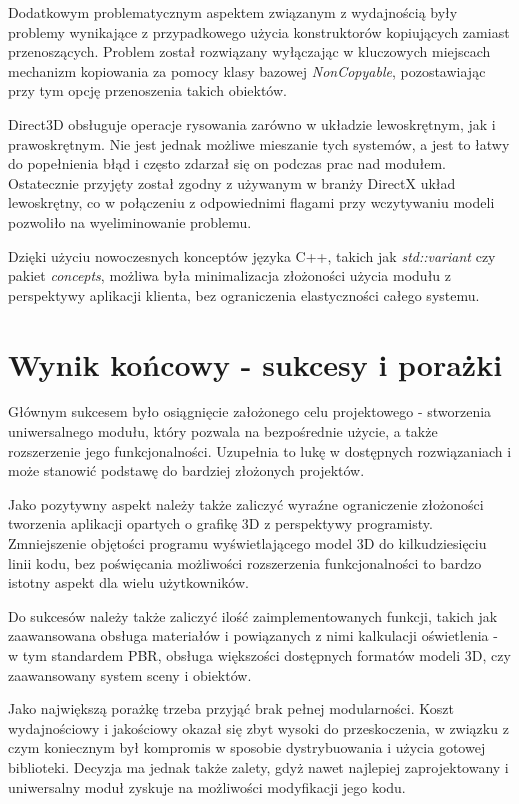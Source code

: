 Dodatkowym problematycznym aspektem związanym z wydajnością były problemy wynikające z przypadkowego użycia konstruktorów kopiujących zamiast przenoszących. Problem został rozwiązany wyłączając w kluczowych miejscach mechanizm kopiowania za pomocy klasy bazowej \textit{NonCopyable}, pozostawiając przy tym opcję przenoszenia takich obiektów.

Direct3D obsługuje operacje rysowania zarówno w układzie lewoskrętnym, jak i prawoskrętnym. Nie jest jednak możliwe mieszanie tych systemów, a jest to łatwy do popełnienia błąd i często zdarzał się on podczas prac nad modułem. Ostatecznie przyjęty został zgodny z używanym w branży DirectX układ lewoskrętny, co w połączeniu z odpowiednimi flagami przy wczytywaniu modeli pozwoliło na wyeliminowanie problemu. 

Dzięki użyciu nowoczesnych konceptów języka C++, takich jak \textit{std::variant} czy pakiet \textit{concepts}, możliwa była minimalizacja złożoności użycia modułu z perspektywy aplikacji klienta, bez ograniczenia elastyczności całego systemu. 

\section{Wynik końcowy - sukcesy i porażki}
Głównym sukcesem było osiągnięcie założonego celu projektowego - stworzenia uniwersalnego modułu, który pozwala na bezpośrednie użycie, a także rozszerzenie jego funkcjonalności. Uzupełnia to lukę w dostępnych rozwiązaniach i może stanowić podstawę do bardziej złożonych projektów.

Jako pozytywny aspekt należy także zaliczyć wyraźne ograniczenie złożoności tworzenia aplikacji opartych o grafikę 3D z perspektywy programisty. Zmniejszenie objętości programu wyświetlającego model 3D do kilkudziesięciu linii kodu, bez poświęcania możliwości rozszerzenia funkcjonalności to bardzo istotny aspekt dla wielu użytkowników.

Do sukcesów należy także zaliczyć ilość zaimplementowanych funkcji, takich jak zaawansowana obsługa materiałów i powiązanych z nimi kalkulacji oświetlenia - w tym standardem PBR, obsługa większości dostępnych formatów modeli 3D, czy zaawansowany system sceny i obiektów.

Jako największą porażkę trzeba przyjąć brak pełnej modularności. Koszt wydajnościowy i jakościowy okazał się zbyt wysoki do przeskoczenia, w związku z czym koniecznym był kompromis w sposobie dystrybuowania i użycia gotowej biblioteki. Decyzja ma jednak także zalety, gdyż nawet najlepiej zaprojektowany i uniwersalny moduł zyskuje na możliwości modyfikacji jego kodu. 

